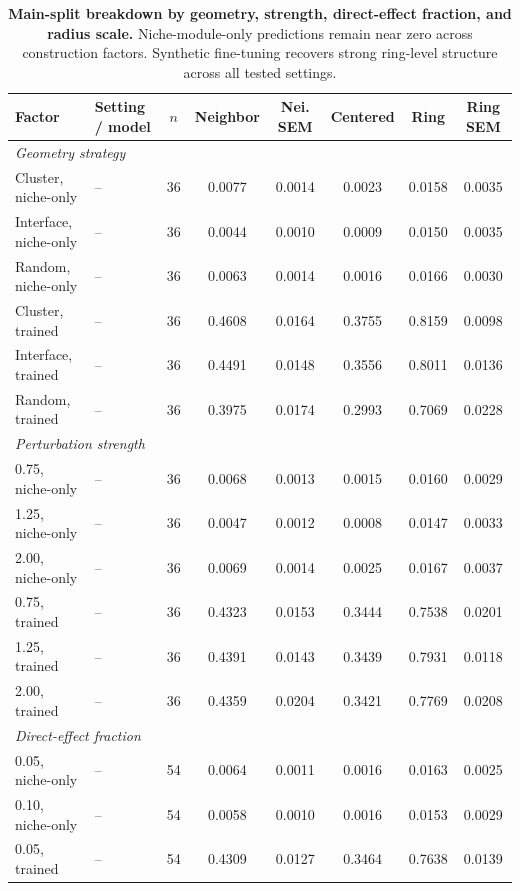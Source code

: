 \documentclass[sigconf,review,balance=false]{acmart}
\begin{document}
\begin{table}[t]
\centering
\small
\setlength{\tabcolsep}{4pt}
\renewcommand{\arraystretch}{1.08}
\caption{\textbf{Main-split breakdown by geometry, strength, direct-effect fraction, and radius scale.}
Niche-module-only predictions remain near zero across construction factors. Synthetic fine-tuning
recovers strong ring-level structure across all tested settings.}
\label{tab:synthetic_lr_factor_breakdown}
\begin{tabular}{llcccccc}
\toprule
Factor & Setting / model & $n$ & Neighbor & Nei. SEM & Centered & Ring & Ring SEM \\
\midrule
\multicolumn{8}{l}{\textit{Geometry strategy}} \\
Cluster, niche-only & -- & 36 & 0.0077 & 0.0014 & 0.0023 & 0.0158 & 0.0035 \\
Interface, niche-only & -- & 36 & 0.0044 & 0.0010 & 0.0009 & 0.0150 & 0.0035 \\
Random, niche-only & -- & 36 & 0.0063 & 0.0014 & 0.0016 & 0.0166 & 0.0030 \\
Cluster, trained & -- & 36 & 0.4608 & 0.0164 & 0.3755 & 0.8159 & 0.0098 \\
Interface, trained & -- & 36 & 0.4491 & 0.0148 & 0.3556 & 0.8011 & 0.0136 \\
Random, trained & -- & 36 & 0.3975 & 0.0174 & 0.2993 & 0.7069 & 0.0228 \\
\midrule
\multicolumn{8}{l}{\textit{Perturbation strength}} \\
0.75, niche-only & -- & 36 & 0.0068 & 0.0013 & 0.0015 & 0.0160 & 0.0029 \\
1.25, niche-only & -- & 36 & 0.0047 & 0.0012 & 0.0008 & 0.0147 & 0.0033 \\
2.00, niche-only & -- & 36 & 0.0069 & 0.0014 & 0.0025 & 0.0167 & 0.0037 \\
0.75, trained & -- & 36 & 0.4323 & 0.0153 & 0.3444 & 0.7538 & 0.0201 \\
1.25, trained & -- & 36 & 0.4391 & 0.0143 & 0.3439 & 0.7931 & 0.0118 \\
2.00, trained & -- & 36 & 0.4359 & 0.0204 & 0.3421 & 0.7769 & 0.0208 \\
\midrule
\multicolumn{8}{l}{\textit{Direct-effect fraction}} \\
0.05, niche-only & -- & 54 & 0.0064 & 0.0011 & 0.0016 & 0.0163 & 0.0025 \\
0.10, niche-only & -- & 54 & 0.0058 & 0.0010 & 0.0016 & 0.0153 & 0.0029 \\
0.05, trained & -- & 54 & 0.4309 & 0.0127 & 0.3464 & 0.7638 & 0.0139 \\

\end{tabular}
\end{table}
\end{document}
